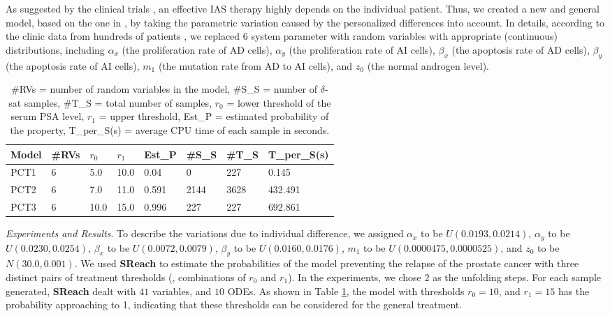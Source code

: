 As suggested by the clinical trials \cite{bruchovsky2006final}, an effective IAS therapy highly depends on the individual patient. Thus, we created a new and general model, based on the one in \cite{tanaka2010mathematical},  by taking the parametric variation caused by the personalized differences into account. In details, according to the clinic data from hundreds of patients \cite{bruchovsky2007locally}, we replaced 6 system parameter with random variables with appropriate (continuous) distributions, including $\alpha_x$ (the proliferation rate of AD cells), $\alpha_y$ (the proliferation rate of AI cells), $\beta_x$ (the apoptosis rate of AD cells), $\beta_y$ (the apoptosis rate of AI cells), $m_1$ (the mutation rate from AD to AI cells), and $z_0$ (the normal androgen level).
\begin{table}[h]
\centering
    \begin{tabular}{|l|l|l|l|l|l|l|l|}
    \hline
    Model & \#RVs & $r_0$ & $r_1$ & Est\_P & \#S\_S & \#T\_S & T\_per\_S(s) \\ \hline
    PCT1  & 6     & 5.0  & 10.0 & 0.04   & 0      & 227    & 0.145        \\ \hline
    PCT2  & 6     & 7.0  & 11.0 & 0.591  & 2144   & 3628   & 432.491      \\ \hline
    PCT3  & 6     & 10.0 & 15.0 & 0.996  & 227    & 227    & 692.861      \\ \hline
    \end{tabular}
    \caption {\#RVs = number of random variables in the model, \#S\_S = number of $\delta$-sat samples, 
\#T\_S = total number of samples, $r_0$ = lower threshold of the serum PSA level, $r_1$ = upper threshold, 
Est\_P = estimated probability of the property, T\_per\_S(s) = average CPU time of each sample in seconds.}
    \label{table:prostate}
\end{table}

\textit{Experiments and Results}. To describe the variations due to individual difference, we assigned $\alpha_x$ to be $U(0.0193, 0.0214)$, $\alpha_y$ to be $U(0.0230, 0.0254)$, $\beta_x$ to be $U(0.0072, 0.0079)$, $\beta_y$ to be $U(0.0160, 0.0176)$, $m_1$ to be $U(0.0000475, 0.0000525) $, and $z_0$ to be $N(30.0, 0.001)$. 
We used {\bf SReach} to estimate the probabilities of the model preventing the relapse of the prostate cancer with three distinct pairs of treatment thresholds (\ie, combinations of $r_0$ and $r_1$).  In the experiments, we chose 2 as the unfolding steps. For each sample generated, {\bf SReach} dealt with $41$ variables, and $10$ ODEs. As shown in Table \ref{table:prostate}, the model with thresholds $r_0 = 10$, and $r_1 = 15$ has the probability approaching to 1, indicating that these thresholds can be considered for the general treatment. 

